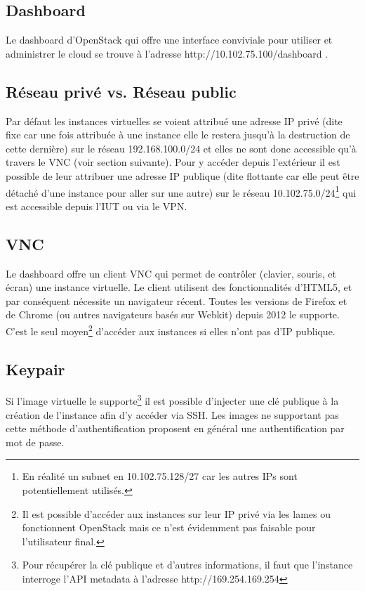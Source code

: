 \documentclass[a4paper,oneside]{report}
\begin{document}
\subsection{Dashboard}
Le dashboard d'OpenStack qui offre une interface conviviale pour utiliser et administrer le cloud se trouve à l'adresse http://10.102.75.100/dashboard .

\subsection{Réseau privé vs. Réseau public}
Par défaut les instances virtuelles se voient attribué une adresse IP privé (dite fixe car une fois attribuée à une instance elle le restera jusqu'à la destruction de cette dernière) sur le réseau 192.168.100.0/24 et elles ne sont donc accessible qu'à travers le VNC (voir section suivante).
Pour y accéder depuis l'extérieur il est possible de leur attribuer une adresse IP publique (dite flottante car elle peut être détaché d'une instance pour aller sur une autre) sur le réseau 10.102.75.0/24\footnote{En réalité un subnet en 10.102.75.128/27 car les autres IPs sont potentiellement utilisés.} qui est accessible depuis l'IUT ou via le VPN.

\subsection{VNC}
Le dashboard offre un client VNC qui permet de contrôler (clavier, souris, et écran) une instance virtuelle. Le client utilisent des fonctionnalités d'HTML5, et par conséquent nécessite un navigateur récent. Toutes les versions de Firefox et de Chrome (ou autres navigateurs basés sur Webkit) depuis 2012 le supporte.\newline
C'est le seul moyen\footnote{Il est possible d'accéder aux instances sur leur IP privé via les lames ou fonctionnent OpenStack mais ce n'est évidemment pas faisable pour l'utilisateur final.} d'accéder aux instances si elles n'ont pas d'IP publique.

\subsection{Keypair}
Si l'image virtuelle le supporte\footnote{Pour récupérer la clé publique et d'autres informations, il faut que l'instance interroge l'API metadata à l'adresse http://169.254.169.254} il est possible d'injecter une clé publique à la création de l'instance afin d'y accéder via SSH.
Les images ne supportant pas cette méthode d'authentification proposent en général une authentification par mot de passe.
\end{document}
